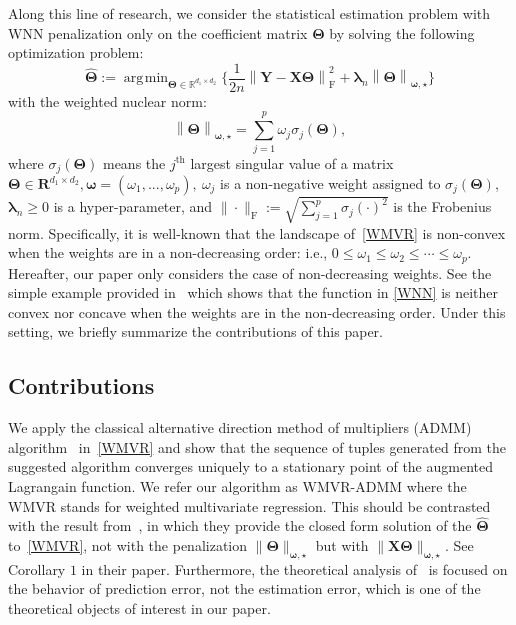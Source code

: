 \documentclass[alpha-refs]{wiley-article}
\DeclareMathOperator*{\argmin}{\arg\!\min}
\begin{document}
Along this line of research, we consider the statistical estimation problem with WNN penalization only on the coefficient matrix $\boldsymbol{\Theta}$ by solving the following optimization problem:
\begin{equation}  \label{WMVR}
    \widehat{\boldsymbol{\Theta}} := \argmin_{\boldsymbol{\Theta}\in\mathbb{R}^{d_{1}\times d_{2}}} \bigg\{ \frac{1}{2n} \left\| \boldsymbol{Y}-\boldsymbol{X}\boldsymbol{\Theta} \right\|_{\text{F}}^{2} + \boldsymbol{\lambda}_{n} \left\| \boldsymbol{\Theta}\right\|_{\boldsymbol{\omega,\star}} \bigg\}
\end{equation}
with the weighted nuclear norm: 
\begin{equation} \label{WNN}
     \left\| \boldsymbol{\Theta} \right\|_{\boldsymbol{\omega,\star}} =\sum^{p}_{j=1} \omega_{j}\sigma_{j}(\boldsymbol{\Theta}),
\end{equation}
where $\sigma_{j}(\boldsymbol{\Theta})$ means the $j^{\text{th}}$ largest singular value of a matrix $\boldsymbol{\Theta} \in \boldsymbol{R}^{d_{1} \times d_{2}}, \boldsymbol{\omega} = (\omega_{1}, ..., \omega_{p}),\ \omega_{j}$ is a non-negative weight assigned to $\sigma_{j}(\boldsymbol{\Theta})$, $\boldsymbol{\lambda}_{n}\geq 0$ is a hyper-parameter, and $\| \cdot \|_{\text{F}}:=\sqrt{\sum_{j=1}^{p}\sigma_{j}(\cdot)^{2}}$ is the Frobenius norm.
Specifically, it is well-known that the landscape of~\eqref{WMVR} is non-convex when the weights are in a non-decreasing order: i.e., $0\leq\omega_{1}\leq\omega_{2}\leq\cdots\leq\omega_{p}$.
Hereafter, our paper only considers the case of non-decreasing weights.
See the simple example provided in~\citet{chen2013reduced} which shows that the function in \eqref{WNN} is neither convex nor concave when the weights are in the non-decreasing order.
Under this setting, we briefly summarize the contributions of this paper.

\subsection{Contributions}
We apply the classical alternative direction method of multipliers (ADMM) algorithm~\citep{boyd2011distributed} in~\eqref{WMVR} and show that the sequence of tuples generated from the suggested algorithm converges uniquely to a stationary point of the augmented Lagrangain function.
We refer our algorithm as WMVR-ADMM where the WMVR stands for weighted multivariate regression.
This should be contrasted with the result from~\citet{chen2013reduced}, in which they provide the closed form solution of the
$\widehat{\boldsymbol{\Theta}}$ to~\eqref{WMVR}, not with the penalization $\|\boldsymbol{\Theta}\|_{\boldsymbol{\omega,\star}}$ but
with $\|\boldsymbol{X\Theta}\|_{\boldsymbol{\omega,\star}}$.
See Corollary $1$ in their paper.
Furthermore, the theoretical analysis of~\citet{chen2013reduced} is focused on the behavior of prediction error, not the estimation error, which is one of the theoretical objects of interest in our paper.
\end{document}
